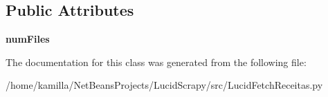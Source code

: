 \subsection*{Public Attributes}
\begin{DoxyCompactItemize}
\item 
\hypertarget{classLucidFetchReceitas_1_1LucidFetchReceitas_a75a0ddd04e7c307e0d58eca22f1eb5f5}{
{\bfseries numFiles}}
\label{classLucidFetchReceitas_1_1LucidFetchReceitas_a75a0ddd04e7c307e0d58eca22f1eb5f5}

\end{DoxyCompactItemize}


The documentation for this class was generated from the following file:\begin{DoxyCompactItemize}
\item 
/home/kamilla/NetBeansProjects/LucidScrapy/src/LucidFetchReceitas.py\end{DoxyCompactItemize}
